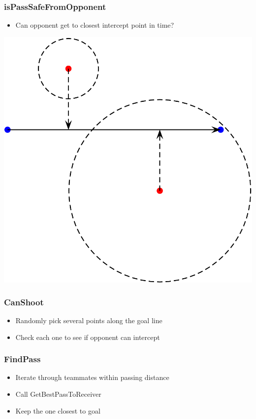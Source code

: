 \documentclass[handout,t,compress]{beamer}
\newcommand{\bframe}[1]{\begin{frame}[fragile]\frametitle{{#1}}}
\begin{document}
\bframe{isPassSafeFromOpponent}
\begin{itemize}
\item Can opponent get to closest intercept point in time?
\end{itemize}
\includegraphics[scale=0.25]{closest.png}
\end{frame}

\bframe{CanShoot}
\begin{itemize}
\item Randomly pick several points along the goal line
\item Check each one to see if opponent can intercept
\end{itemize}
\end{frame}

\bframe{FindPass}
\begin{itemize}
\item Iterate through teammates within passing distance
\item Call GetBestPassToReceiver
\item Keep the one closest to goal
\end{itemize}
\end{frame}
\end{document}
